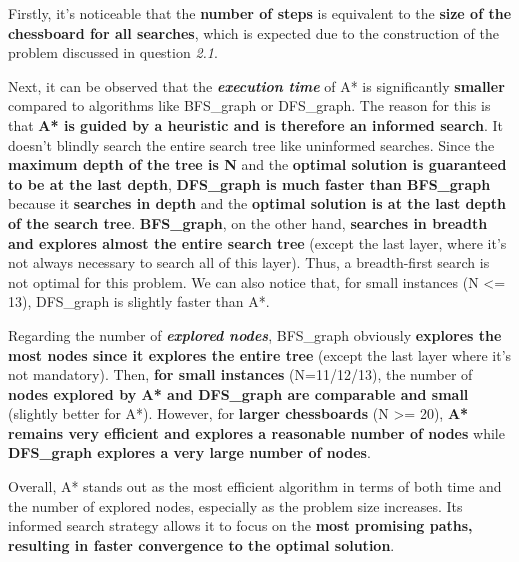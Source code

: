\documentclass[11pt,a4paper]{report}
\begin{document}
\begin{answers}[8cm]
\small{Firstly, it's noticeable that the \textbf{number of steps} is equivalent to the \textbf{size of the chessboard for all searches}, which is expected due to the construction of the problem discussed in question \textit{2.1}.

Next, it can be observed that the \textbf{\textit{execution time}} of A* is significantly \textbf{smaller} compared to algorithms like BFS\_graph or DFS\_graph. The reason for this is that \textbf{A* is guided by a heuristic and is therefore an informed search}. It doesn't blindly search the entire search tree like uninformed searches. Since the \textbf{maximum depth of the tree is N} and the \textbf{optimal solution is guaranteed to be at the last depth}, \textbf{DFS\_graph is much faster than BFS\_graph} because it \textbf{searches in depth} and the \textbf{optimal solution is at the last depth of the search tree}. \textbf{BFS\_graph}, on the other hand, \textbf{searches in breadth and explores almost the entire search tree} (except the last layer, where it's not always necessary to search all of this layer). Thus, a breadth-first search is not optimal for this problem. We can also notice that, for small instances (N <= 13), DFS\_graph is slightly faster than A*.

Regarding the number of \textbf{\textit{explored nodes}}, BFS\_graph obviously \textbf{explores the most nodes since it explores the entire tree} (except the last layer where it's not mandatory). Then, \textbf{for small instances} (N=11/12/13), the number of \textbf{nodes explored by A* and DFS\_graph are comparable and small} (slightly better for A*). However, for \textbf{larger chessboards} (N >= 20), \textbf{A* remains very efficient and explores a reasonable number of nodes} while \textbf{DFS\_graph explores a very large number of nodes}.

Overall, A* stands out as the most efficient algorithm in terms of both time and the number of explored nodes, especially as the problem size increases. Its informed search strategy allows it to focus on the \textbf{most promising paths, resulting in faster convergence to the optimal solution}.}
\end{answers}
\end{document}
